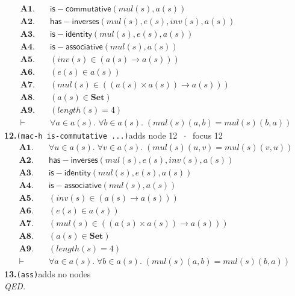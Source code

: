 \documentclass[11pt]{article}
\begin{document}
\begin{align*}
  \mathbf{A1.}\quad & \mathsf{is{-}commutative}(\mathit{mul}(s), a(s)) \\
  \mathbf{A2.}\quad & \mathsf{has{-}inverses}(\mathit{mul}(s), e(s), \mathit{inv}(s), a(s)) \\
  \mathbf{A3.}\quad & \mathsf{is{-}identity}(\mathit{mul}(s), e(s), a(s)) \\
  \mathbf{A4.}\quad & \mathsf{is{-}associative}(\mathit{mul}(s), a(s)) \\
  \mathbf{A5.}\quad & (\mathit{inv}(s) \in (a(s) \to a(s))) \\
  \mathbf{A6.}\quad & (e(s) \in a(s)) \\
  \mathbf{A7.}\quad & (\mathit{mul}(s) \in ((a(s) \times a(s)) \to a(s))) \\
  \mathbf{A8.}\quad & (a(s) \in \mathbf{Set}) \\
  \mathbf{A9.}\quad & (\mathit{length}(s) = 4) \\
  \vdash\quad & \forall a \in a(s).\; \forall b \in a(s).\; (\mathit{mul}(s)(a, b) = \mathit{mul}(s)(b, a))
\end{align*}
\medskip\noindent\textbf{12.}\quad \texttt{(mac-h is-commutative ...)}\hfill{\small adds node 12 $\;\cdot\;$ focus 12}\\[2pt]
\begin{align*}
  \mathbf{A1.}\quad & \forall u \in a(s).\; \forall v \in a(s).\; (\mathit{mul}(s)(u, v) = \mathit{mul}(s)(v, u)) \\
  \mathbf{A2.}\quad & \mathsf{has{-}inverses}(\mathit{mul}(s), e(s), \mathit{inv}(s), a(s)) \\
  \mathbf{A3.}\quad & \mathsf{is{-}identity}(\mathit{mul}(s), e(s), a(s)) \\
  \mathbf{A4.}\quad & \mathsf{is{-}associative}(\mathit{mul}(s), a(s)) \\
  \mathbf{A5.}\quad & (\mathit{inv}(s) \in (a(s) \to a(s))) \\
  \mathbf{A6.}\quad & (e(s) \in a(s)) \\
  \mathbf{A7.}\quad & (\mathit{mul}(s) \in ((a(s) \times a(s)) \to a(s))) \\
  \mathbf{A8.}\quad & (a(s) \in \mathbf{Set}) \\
  \mathbf{A9.}\quad & (\mathit{length}(s) = 4) \\
  \vdash\quad & \forall a \in a(s).\; \forall b \in a(s).\; (\mathit{mul}(s)(a, b) = \mathit{mul}(s)(b, a))
\end{align*}
\medskip\noindent\textbf{13.}\quad \texttt{(ass)}\hfill{\small adds no nodes}\\[2pt]
\emph{QED.}\par
\end{document}
